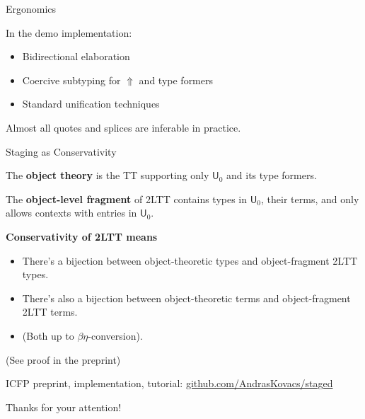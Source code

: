 \documentclass[dvipsnames]{beamer}
\newcommand{\msf}[1]{\mathsf{#1}}
\newcommand{\Lift}{{\Uparrow}}
\newcommand{\U}{\msf{U}}
\theoremstyle{remark}
\begin{document}
\begin{frame}{Ergonomics}

In the demo implementation:
\vspace{1em}

\begin{itemize}
  \item Bidirectional elaboration
  \item Coercive subtyping for $\Lift$ and type formers
  \item Standard unification techniques
\end{itemize}
\vspace{1em}

Almost all quotes and splices are inferable in practice.

\end{frame}

\begin{frame}{Staging as Conservativity}

The \textbf{object theory} is the TT supporting only $\U_0$ and its type formers.
\vspace{1em}
\pause

The \textbf{object-level fragment} of 2LTT contains types in $\U_0$, their terms,
and only allows contexts with entries in $\U_0$.
\vspace{1em}
\pause

\textbf{Conservativity of 2LTT means}
\begin{itemize}
  \item There's a bijection between object-theoretic types and object-fragment 2LTT types.
  \item There's also a bijection between object-theoretic terms and object-fragment 2LTT terms.
  \item (Both up to $\beta\eta$-conversion).
\end{itemize}
\vspace{1em}

(See proof in the preprint)


\end{frame}




\begin{frame}{}

ICFP preprint, implementation, tutorial: \url{github.com/AndrasKovacs/staged}
\vspace{2em}

\begin{center}
  \Large {Thanks for your attention!}
\end{center}


\end{frame}
\end{document}
